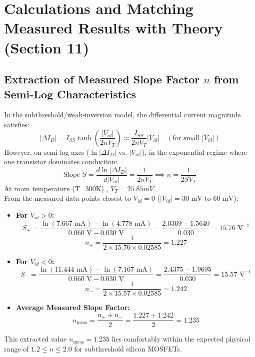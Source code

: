 \documentclass[11pt,a4paper]{article}
\begin{document}
\newpage
\section{Calculations and Matching Measured Results with Theory (Section 11)}

\subsection{Extraction of Measured Slope Factor \texorpdfstring{$n$}{n} from Semi-Log Characteristics}
In the subthreshold/weak-inversion model, the differential current magnitude satisfies:
\begin{equation}
    |\Delta I_D| = I_{SS} \tanh\left(\frac{|V_{id}|}{2 n V_T}\right) \approx \frac{I_{SS}}{2 n V_T} |V_{id}| \quad (\text{for small } |V_{id}|)
\end{equation}
However, on semi-log axes ($\ln |\Delta I_D|$ vs. $|V_{id}|$), in the exponential regime where one transistor dominates conduction:
\begin{equation}
    \text{Slope } S = \frac{d \ln |\Delta I_D|}{d |V_{id}|} = \frac{1}{2 n V_T} \implies n = \frac{1}{2 S V_T}
\end{equation}
At room temperature (T=300K) , $V_{T} = 25.85 mV$.\\
From the measured data points closest to $V_{id} = 0$ ($|V_{id}| = 30\text{ mV}$ to $60\text{ mV}$):
\begin{itemize}
    \item \textbf{For $V_{id} > 0$:}
    \begin{equation}
        S_+ = \frac{\ln(7.667\text{ mA}) - \ln(4.778\text{ mA})}{0.060\text{ V} - 0.030\text{ V}} = \frac{2.0369 - 1.5640}{0.030} = 15.76\text{ V}^{-1}
    \end{equation}
    \begin{equation}
        n_+ = \frac{1}{2 \times 15.76 \times 0.02585} = 1.227
    \end{equation}
    \item \textbf{For $V_{id} < 0$:}
    \begin{equation}
        S_- = \frac{\ln(11.444\text{ mA}) - \ln(7.167\text{ mA})}{0.060\text{ V} - 0.030\text{ V}} = \frac{2.4375 - 1.9695}{0.030} = 15.57\text{ V}^{-1}
    \end{equation}
    \begin{equation}
        n_- = \frac{1}{2 \times 15.57 \times 0.02585} = 1.242
    \end{equation}
    \item \textbf{Average Measured Slope Factor:}
    \begin{equation}
        n_{\text{meas}} = \frac{n_+ + n_-}{2} = \frac{1.227 + 1.242}{2} = \mathbf{1.235}
    \end{equation}
\end{itemize}
This extracted value $n_{\text{meas}} = 1.235$ lies comfortably within the expected physical range of $1.2 \le n \le 2.0$ for subthreshold silicon MOSFETs.
\end{document}

